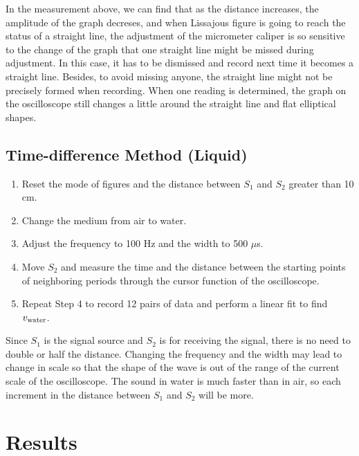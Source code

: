 \documentclass[a4paper]{report}
\begin{document}
	In the measurement above, we can find that as the distance increases, the amplitude of the graph decreses, and when Lissajous figure is going to reach the status of a straight line, the adjustment of the micrometer caliper is so sensitive to the change of the graph that one straight line might be missed during adjustment. In this case, it has to be dismissed and record next time it becomes a straight line. Besides, to avoid missing anyone, the straight line might not be precisely formed when recording. When one reading is determined, the graph on the oscilloscope still changes a little around the straight line and flat elliptical shapes.
	\subsection{Time-difference Method (Liquid)}
	\begin{enumerate}[1.]
		\item Reset the mode of figures and the distance between $S_1$ and $S_2$ greater than 10 cm.
		\item Change the medium from air to water.
		\item Adjust the frequency to 100 Hz and the width to 500 $\mu$s.
		\item Move $S_2$ and measure the time and the distance between the starting points of neighboring periods through the cursor function of the oscilloscope.
		\item Repeat Step 4 to record 12 pairs of data and perform a linear fit to find $v_{\rm water}$.
	\end{enumerate}

	Since $S_1$ is the signal source and $S_2$ is for receiving the signal, there is no need to double or half the distance. Changing the frequency and the width may lead to change in scale so that the shape of the wave is out of the range of the current scale of the oscilloscope. The sound in water is much faster than in air, so each increment in the distance between $S_1$ and $S_2$ will be more.
	\section{Results}
\end{document}
